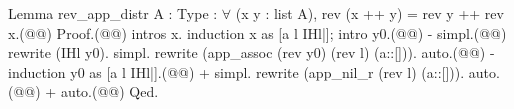 Lemma rev_app_distr {A : Type} : $\forall$ (x y : list A), rev (x ++ y) = rev y ++ rev x.(@\vspace{-0.04cm}@)
Proof.(@\vspace{-0.04cm}@)
  intros x. induction x as [a l IHl|]; intro y0.(@\vspace{-0.04cm}@)
  - simpl.(@\vspace{-0.04cm}@)
    rewrite (IHl y0). simpl. rewrite (app_assoc (rev y0) (rev l) (a::[])). auto.(@\vspace{-0.04cm}@)
  - induction y0 as [a l IHl|].(@\vspace{-0.04cm}@)
    + simpl. rewrite (app_nil_r (rev l) (a::[])). auto.(@\vspace{-0.04cm}@)
    + auto.(@\vspace{-0.04cm}@)
Qed.
